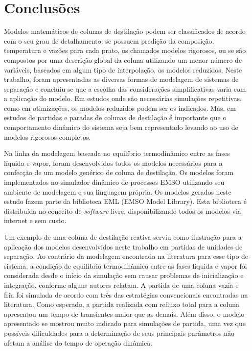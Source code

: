 %
% 
%
\chapter{Conclusões} \label{chap:conclusoes}
% 

Modelos matemáticos de colunas de destilação podem ser classificados de acordo com o seu
grau de detalhamento: se possuem predição da composição, temperatura e vazões para cada prato,
os chamados modelos rigorosos, ou se são compostos por uma descrição global da coluna
utilizando um menor número de variáveis, baseados em algum tipo de interpolação, os modelos
reduzidos. Neste trabalho, foram apresentadas as diversas formas de
modelagem de sistemas de separação e concluiu-se que a escolha das considerações
simplificativas varia com a aplicação do modelo. Em estudos onde são necessárias simulações
repetitivas, como em otimizações, os modelos reduzidos podem ser os indicados.
Mas, em estudos de partidas e paradas de colunas de destilação é importante que o
comportamento dinâmico do sistema seja bem representado levando ao uso de
modelos rigorosos completos. 

Na linha da modelagem baseada no equilíbrio termodinâmico entre as fases líquida e vapor, foram
desenvolvidos todos os modelos necessários para a confecção de um modelo genérico de coluna
de destilação. Os modelos foram implementados no simulador dinâmico de processos EMSO
utilizando seu ambiente de modelagem e sua linguagem própria. Os modelos gerados neste estudo
fazem parte da biblioteca EML (EMSO Model Library). Esta biblioteca é distribuída no conceito
de \emph{software} livre, disponibilizando todos os modelos via internet e sem
custo.

Um exemplo de uma coluna de destilação reativa serviu como ilustração para a aplicação
dos modelos desenvolvidos neste trabalho em partidas de unidades de separação.
Ao contrário da modelagem encontrada na literatura para esse tipo de sistema, a condição de
equilíbrio termodinâmico entre as fases líquida e vapor foi considerada desde o início da
simulação sem causar problemas de inicialização e integração, conforme alguns autores relatam.
A partida de uma
coluna vazia e fria foi simulada de acordo com três das estratégias convencionais encontradas
na literatura. Como esperado, a partida realizada com refluxo total para a coluna apresentou um
tempo de transientes maior que as demais. Além disso, o modelo apresentado se mostrou muito
indicado para simulações de partida, uma vez que possíveis dificuldades para a determinação de
seus principais parâmetros não afetam a análise do tempo de operação dinâmica.


